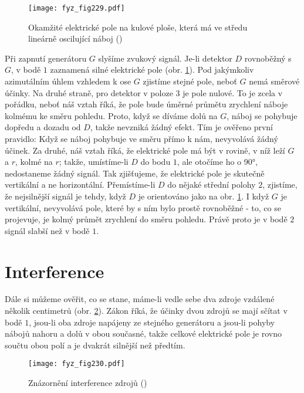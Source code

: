 {    \begin{figure}[ht!] %
      \centering
      \texttt{[image: fyz\_fig229.pdf]}
      \caption{Okamžité elektrické pole na kulové ploše, která má ve středu lineárně oscilující 
               náboj (\cite[s.~376]{Feynman01})}
      \label{fyz:fig229}
    \end{figure}

    Při zapnutí generátoru \(G\) slyšíme zvukový signál. Je-li detektor \(D\) rovnoběžný s \(G\), v 
    bodě \(1\) zaznamená silné elektrické pole (obr. \ref{fyz:fig229}). Pod jakýmkoliv azimutálním 
    úhlem vzhledem k ose \(G\) zjistíme stejné pole, neboť \(G\) nemá směrové účinky. Na druhé 
    straně, pro detektor v poloze \(3\) je pole nulové. To je zcela v pořádku, neboť náš vztah 
    říká, že pole bude úměrné průmětu zrychlení náboje kolmému ke směru pohledu. Proto, když se 
    díváme dolů na \(G\), náboj se pohybuje dopředu a dozadu od \(D\), takže nevzniká žádný efekt. 
    Tím je ověřeno první pravidlo: Když se náboj pohybuje ve směru přímo k nám, nevyvolává žádný 
    účinek. Za druhé, náš vztah říká, že elektrické pole má být v rovině, v níž leží \(G\) a \(r\), 
    kolmé na \(r\); takže, umístíme-li \(D\) do bodu \(1\), ale otočíme ho o \ang{90}, nedostaneme 
    žádný signál. Tak zjišťujeme, že elektrické pole je skutečně vertikální a ne horizontální. 
    Přemístíme-li \(D\) do nějaké střední polohy \(2\), zjistíme, že nejsilnější signál je tehdy, 
    když \(D\) je orientováno jako na obr. \ref{fyz:fig229}. I když \(G\) je vertikální,
    nevyvolává pole, které by s ním bylo prostě rovnoběžné - to, co se projevuje, je kolmý průmět 
    zrychlení do směru pohledu. Právě proto je v bodě \(2\) signál slabší než v bodě \(1\).
    
  \section{Interference}\label{fyz:IchapXXVIIIsecIV}
    Dále si můžeme ověřit, co se stane, máme-li vedle sebe dva zdroje vzdálené několik centimetrů 
    (obr. \ref{fyz:fig230}). Zákon říká, že účinky dvou zdrojů se mají sčítat v bodě \(1\), jsou-li 
    oba zdroje napájeny ze stejného generátoru a jsou-li pohyby nábojů nahoru a dolů v obou 
    současné, takže celkové elektrické pole je rovno součtu obou polí a je dvakrát silnější než 
    předtím.
    
    \begin{figure}[ht!] %
      \centering
      \texttt{[image: fyz\_fig230.pdf]}
      \caption{Znázornění interference zdrojů
               (\cite[s.~377]{Feynman01})}
      \label{fyz:fig230}
    \end{figure}
    
}
